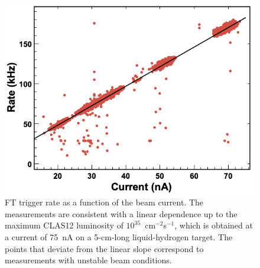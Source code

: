 \begin{figure}[h]
\includegraphics[height=0.68\columnwidth]{fig/ft_trigger.png}
\caption{FT trigger rate as a function of the beam current. The measurements are consistent with a linear dependence
  up to the maximum CLAS12 luminosity of $10^{35}$~cm$^{-2}$s$^{-1}$, which is obtained at a current of 75~nA on a
  5-cm-long liquid-hydrogen target. The points that deviate from the linear slope correspond to measurements with
  unstable beam conditions.}
\label{fig:trigger_rate}
\end{figure}

